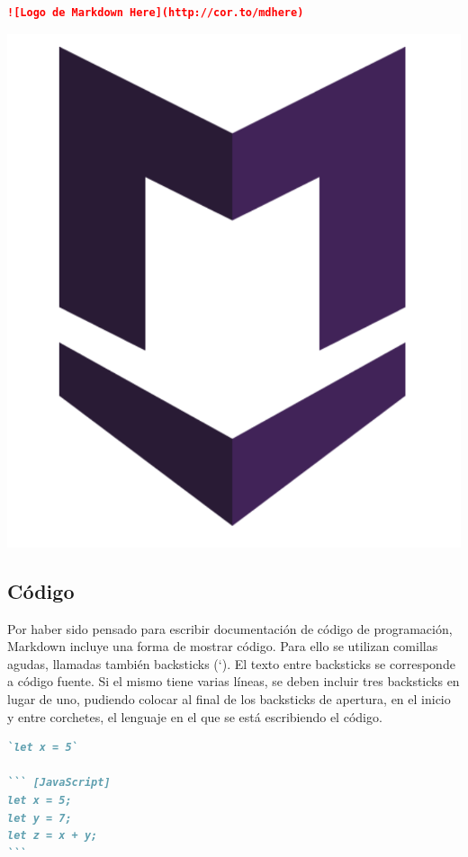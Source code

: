 \begin{lstlisting}[language=Markdown]
![Logo de Markdown Here](http://cor.to/mdhere)
\end{lstlisting}

\includegraphics[scale=0.4]{anexos/markdown/imagenes/md_imagen.png}

\subsection*{Código}

Por haber sido pensado para escribir documentación de código de programación,
Markdown incluye una forma de mostrar código. Para ello se utilizan comillas
agudas, llamadas también backsticks (`). El texto entre backsticks se corresponde
a código fuente. Si el mismo tiene varias líneas, se deben incluir tres backsticks
en lugar de uno, pudiendo colocar al final de los backsticks de apertura,
en el inicio y entre corchetes, el lenguaje en el que se está escribiendo el código.

\begin{lstlisting}[language=Markdown]
`let x = 5`

``` [JavaScript]
let x = 5;
let y = 7;
let z = x + y;
```
\end{lstlisting}

